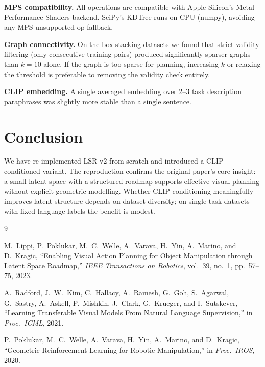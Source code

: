 \documentclass[10pt,twocolumn]{IEEEtran}
\begin{document}
\textbf{MPS compatibility.}  All operations are compatible with Apple
Silicon's Metal Performance Shaders backend.  SciPy's KDTree runs on CPU
(numpy), avoiding any MPS unsupported-op fallback.

\textbf{Graph connectivity.}  On the box-stacking datasets we found that
strict validity filtering (only consecutive training pairs) produced
significantly sparser graphs than $k=10$ alone.  If the graph is too
sparse for planning, increasing $k$ or relaxing the threshold is
preferable to removing the validity check entirely.

\textbf{CLIP embedding.}  A single averaged embedding over 2--3 task
description paraphrases was slightly more stable than a single sentence.

\section{Conclusion}

We have re-implemented LSR-v2 from scratch and introduced a CLIP-conditioned
variant.  The reproduction confirms the original paper's core insight: a
small latent space with a structured roadmap supports effective visual
planning without explicit geometric modelling.  Whether CLIP conditioning
meaningfully improves latent structure depends on dataset diversity;
on single-task datasets with fixed language labels the benefit is modest.


\begin{thebibliography}{9}

M.\ Lippi, P.\ Poklukar, M.\ C.\ Welle, A.\ Varava, H.\ Yin, A.\ Marino,
and D.\ Kragic, ``Enabling Visual Action Planning for Object Manipulation
through Latent Space Roadmap,'' \textit{IEEE Transactions on Robotics},
vol.\ 39, no.\ 1, pp.\ 57--75, 2023.

A.\ Radford, J.\ W.\ Kim, C.\ Hallacy, A.\ Ramesh, G.\ Goh,
S.\ Agarwal, G.\ Sastry, A.\ Askell, P.\ Mishkin, J.\ Clark,
G.\ Krueger, and I.\ Sutskever, ``Learning Transferable Visual Models
From Natural Language Supervision,'' in \textit{Proc.\ ICML}, 2021.

P.\ Poklukar, M.\ C.\ Welle, A.\ Varava, H.\ Yin, A.\ Marino, and
D.\ Kragic, ``Geometric Reinforcement Learning for Robotic Manipulation,''
in \textit{Proc.\ IROS}, 2020.

\end{thebibliography}
\end{document}
